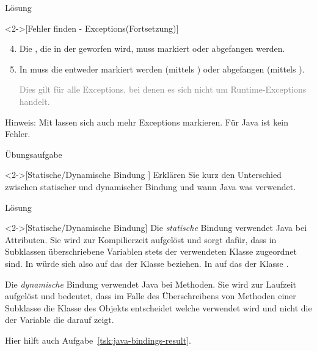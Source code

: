 \begin{frame}[c]{Lösung}
    \addtocounter{solve}{-1}
    \begin{solve}<2->[Fehler finden - Exceptions\hfill(Fortsetzung)]
        \begin{enumerate}[<+(1)->]
            \setcounter{enumi}{3}
            \item Die , die in der  geworfen wird, muss markiert oder abgefangen werden.
            \item In  muss die  entweder markiert werden (mittels ) oder abgefangen (mittels ).\pause\par \textcolor{gray}{Dies gilt für alle Exceptions, bei denen es sich nicht um Runtime-Exceptions handelt.}
        \end{enumerate}
        Hinweis: Mit  lassen sich auch mehr Exceptions markieren. Für Java ist  kein Fehler.
    \end{solve}
\end{frame}

\begin{frame}[c]{Übungsaufgabe}
    \begin{exercise}<2->[Statische/Dynamische Bindung ]
        Erklären Sie kurz den Unterschied zwischen statischer und dynamischer Bindung und wann Java was verwendet.
    \end{exercise}
\end{frame}

\begin{frame}[c]{Lösung}
    \begin{solve}<2->[Statische/Dynamische Bindung]
        Die \emph{statische} Bindung verwendet Java bei Attributen. Sie wird zur Kompilierzeit aufgelöst und sorgt dafür, dass in Subklassen überschriebene Variablen stets der verwendeten Klasse zugeordnet sind. In  würde sich  also auf das  der Klasse  beziehen. In  auf das der Klasse .\medskip\par
        \pause{}Die \emph{dynamische} Bindung verwendet Java bei Methoden. Sie wird zur Laufzeit aufgelöst und bedeutet, dass im Falle des Überschreibens von Methoden einer Subklasse die Klasse des Objekts entscheidet welche verwendet wird und nicht die der Variable die darauf zeigt.\pause\medskip\par
        Hier hilft auch Aufgabe~\ref{tsk:java-bindings-result}.
    \end{solve}
\end{frame}

